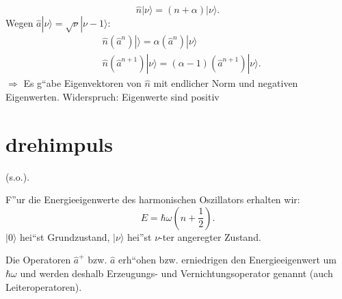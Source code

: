 \begin{equation}
	\hat n|\nu\rangle = (n+\alpha) |\nu\rangle.
\end{equation}
Wegen $\hat a |\nu \rangle = \sqrt{\nu} |\nu-1\rangle$:
\begin{align}
	&\hat n (\hat a^n) |\rangle = \alpha (\hat a^n) |\nu\rangle\\
	&\hat n(\hat a^{n+1})|\nu \rangle = (\alpha-1)(\hat a^{n+1})|\nu \rangle.
\end{align}
$\Rightarrow$ Es g``abe Eigenvektoren von $\hat n$ mit endlicher Norm und negativen Eigenwerten. %
Widerspruch: Eigenwerte sind positiv \section{drehimpuls}
\label{sec:drehimpuls}
(s.o.).

F''ur die Energieeigenwerte des harmonischen Oszillators erhalten wir:
\begin{equation}
	E = \hbar \omega \left(n+\frac{1}{2}\right).
\end{equation}
$|0 \rangle$ hei``st Grundzustand, $|\nu \rangle$ hei''st $\nu$-ter angeregter Zustand. 

Die Operatoren $\hat a^+$ bzw. $\hat a$ erh``ohen bzw. erniedrigen den Energieeigenwert um $\hbar \omega$ und
werden deshalb Erzeugungs- und Vernichtungsoperator genannt (auch Leiteroperatoren).